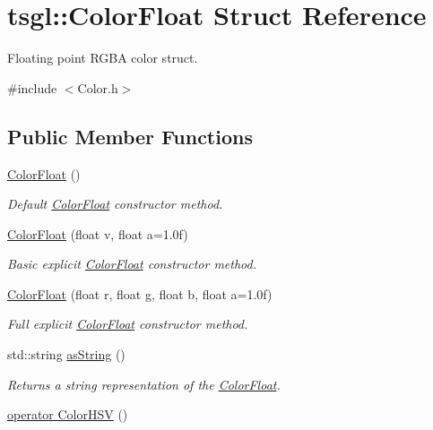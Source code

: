 \hypertarget{structtsgl_1_1_color_float}{}\section{tsgl\+:\+:Color\+Float Struct Reference}
\label{structtsgl_1_1_color_float}


Floating point R\+G\+B\+A color struct.  




{\ttfamily \#include $<$Color.\+h$>$}

\subsection*{Public Member Functions}
\begin{DoxyCompactItemize}
\item 
\hyperlink{structtsgl_1_1_color_float_a22e82c71a0feedbb7b3e3a7a73b80e30}{Color\+Float} ()
\begin{DoxyCompactList}\small\item\em Default \hyperlink{structtsgl_1_1_color_float}{Color\+Float} constructor method. \end{DoxyCompactList}\item 
\hyperlink{structtsgl_1_1_color_float_a134643b43f1d8acaed32095f04942140}{Color\+Float} (float v, float a=1.\+0f)
\begin{DoxyCompactList}\small\item\em Basic explicit \hyperlink{structtsgl_1_1_color_float}{Color\+Float} constructor method. \end{DoxyCompactList}\item 
\hyperlink{structtsgl_1_1_color_float_a6c46a2073d9e208aa3f07cc04565a489}{Color\+Float} (float r, float g, float b, float a=1.\+0f)
\begin{DoxyCompactList}\small\item\em Full explicit \hyperlink{structtsgl_1_1_color_float}{Color\+Float} constructor method. \end{DoxyCompactList}\item 
std\+::string \hyperlink{structtsgl_1_1_color_float_a1048e8773d65fa1554bc8782e76527ed}{as\+String} ()
\begin{DoxyCompactList}\small\item\em Returns a string representation of the \hyperlink{structtsgl_1_1_color_float}{Color\+Float}. \end{DoxyCompactList}\item 
\hyperlink{structtsgl_1_1_color_float_a4d74b061239eed7eb351422c18e33a37}{operator Color\+H\+S\+V} ()

\end{DoxyCompactItemize}
